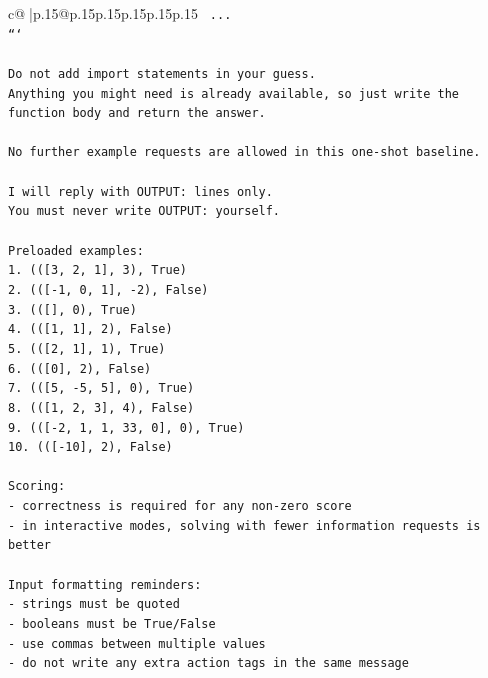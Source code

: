 \documentclass{article}
\begin{document}
{\begin{supertabular}{c@{$\;$}|p{.15\linewidth}@{}p{.15\linewidth}p{.15\linewidth}p{.15\linewidth}p{.15\linewidth}p{.15\linewidth}}
{{{\texttt{    ...} \\
\texttt{```} \\
\\ 
\texttt{Do not add import statements in your guess.} \\
\texttt{Anything you might need is already available, so just write the function body and return the answer.} \\
\\ 
\texttt{No further example requests are allowed in this one{-}shot baseline.} \\
\\ 
\texttt{I will reply with OUTPUT: lines only.} \\
\texttt{You must never write OUTPUT: yourself.} \\
\\ 
\texttt{Preloaded examples:} \\
\texttt{1. (({[}3, 2, 1{]}, 3), True)} \\
\texttt{2. (({[}{-}1, 0, 1{]}, {-}2), False)} \\
\texttt{3. (({[}{]}, 0), True)} \\
\texttt{4. (({[}1, 1{]}, 2), False)} \\
\texttt{5. (({[}2, 1{]}, 1), True)} \\
\texttt{6. (({[}0{]}, 2), False)} \\
\texttt{7. (({[}5, {-}5, 5{]}, 0), True)} \\
\texttt{8. (({[}1, 2, 3{]}, 4), False)} \\
\texttt{9. (({[}{-}2, 1, 1, 33, 0{]}, 0), True)} \\
\texttt{10. (({[}{-}10{]}, 2), False)} \\
\\ 
\texttt{Scoring:} \\
\texttt{{-} correctness is required for any non{-}zero score} \\
\texttt{{-} in interactive modes, solving with fewer information requests is better} \\
\\ 
\texttt{Input formatting reminders:} \\
\texttt{{-} strings must be quoted} \\
\texttt{{-} booleans must be True/False} \\
\texttt{{-} use commas between multiple values} \\
\texttt{{-} do not write any extra action tags in the same message} \\
\\ 
}}}
\end{supertabular}}
\end{document}
